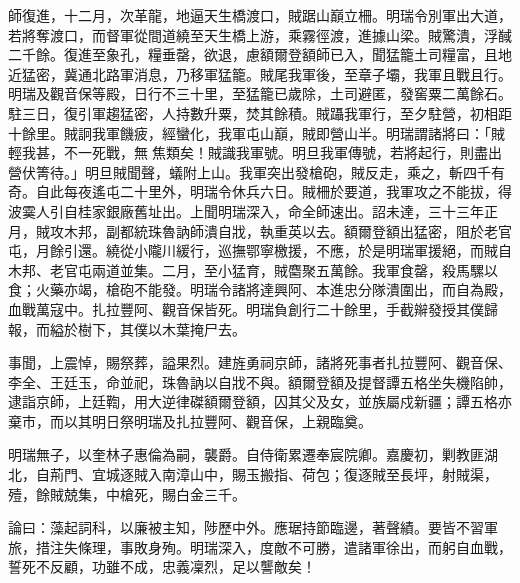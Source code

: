 \begin{pinyinscope}
師復進，十二月，次革龍，地逼天生橋渡口，賊踞山巔立柵。明瑞令別軍出大道，若將奪渡口，而督軍從間道繞至天生橋上游，乘霧徑渡，進據山梁。賊驚潰，浮馘二千餘。復進至象孔，糧垂罄，欲退，慮額爾登額師已入，聞猛籠土司糧富，且地近猛密，冀通北路軍消息，乃移軍猛籠。賊尾我軍後，至章子壩，我軍且戰且行。明瑞及觀音保等殿，日行不三十里，至猛籠已歲除，土司避匿，發窖粟二萬餘石。駐三日，復引軍趨猛密，人持數升粟，焚其餘積。賊躡我軍行，至夕駐營，初相距十餘里。賊詗我軍饑疲，經蠻化，我軍屯山巔，賊即營山半。明瑞謂諸將曰：「賊輕我甚，不一死戰，無焦類矣！賊識我軍號。明旦我軍傳號，若將起行，則盡出營伏箐待。」明旦賊聞聲，蟻附上山。我軍突出發槍砲，賊反走，乘之，斬四千有奇。自此每夜遙屯二十里外，明瑞令休兵六日。賊柵於要道，我軍攻之不能拔，得波霙人引自桂家銀廠舊址出。上聞明瑞深入，命全師速出。詔未達，三十三年正月，賊攻木邦，副都統珠魯訥師潰自戕，執重英以去。額爾登額出猛密，阻於老官屯，月餘引還。繞從小隴川緩行，巡撫鄂寧檄援，不應，於是明瑞軍援絕，而賊自木邦、老官屯兩道並集。二月，至小猛育，賊麕聚五萬餘。我軍食罄，殺馬騾以食；火藥亦竭，槍砲不能發。明瑞令諸將達興阿、本進忠分隊潰圍出，而自為殿，血戰萬寇中。扎拉豐阿、觀音保皆死。明瑞負創行二十餘里，手截辮發授其僕歸報，而縊於樹下，其僕以木葉掩尸去。

事聞，上震悼，賜祭葬，謚果烈。建旌勇祠京師，諸將死事者扎拉豐阿、觀音保、李全、王廷玉，命並祀，珠魯訥以自戕不與。額爾登額及提督譚五格坐失機陷帥，逮詣京師，上廷鞫，用大逆律磔額爾登額，囚其父及女，並族屬戍新疆；譚五格亦棄市，而以其明日祭明瑞及扎拉豐阿、觀音保，上親臨奠。

明瑞無子，以奎林子惠倫為嗣，襲爵。自侍衛累遷奉宸院卿。嘉慶初，剿教匪湖北，自荊門、宜城逐賊入南漳山中，賜玉搬指、荷包；復逐賊至長坪，射賊渠，殪，餘賊兢集，中槍死，賜白金三千。

論曰：藻起詞科，以廉被主知，陟歷中外。應琚持節臨邊，著聲績。要皆不習軍旅，措注失條理，事敗身殉。明瑞深入，度敵不可勝，遣諸軍徐出，而躬自血戰，誓死不反顧，功雖不成，忠義凜烈，足以讋敵矣！


\end{pinyinscope}